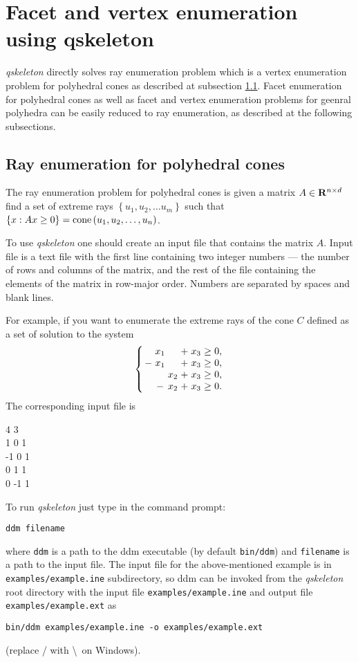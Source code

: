 \documentclass{article}
\newcommand{\qskeleton}{{\itshape qskeleton}\xspace}
\newcommand{\RR}{{\rm\bf R}}
\newcommand{\cone}[1]{\mathop{\rm cone} \left( #1 \right)}
\newcommand{\set}[1]{\left\{ #1\right\}}
\newenvironment{narrowarray}[1]{\arraycolsep=0.15em\begin{array}{#1}}{\end{array}}
\begin{document}
\section{Facet and vertex enumeration using qskeleton}

\qskeleton directly solves ray enumeration problem which is a vertex enumeration problem for polyhedral cones as described at subsection \ref{sec_RayEnumeration}. Facet enumeration for polyhedral cones as well as facet and vertex enumeration problems for geenral polyhedra can be easily reduced to ray enumeration, as described at the following subsections.

\subsection{Ray enumeration for polyhedral cones}\label{sec_RayEnumeration}

The ray enumeration problem for polyhedral cones is given a matrix $A\in\RR^{n\times d}$ find a set of extreme rays $\set{u_1, u_2, \dots u_m}$ such that  $\set{x: Ax \geq 0} = \cone{u_1, u_2, \dots, u_n}$.

To use \qskeleton one should create an input file that contains the matrix $A$. Input file is a text file with the first line containing two integer numbers --- the number of rows and columns of the matrix, and the rest of the file containing the elements of the matrix in row-major order. Numbers are separated by spaces and blank lines.

For example, if you want to enumerate the extreme rays of the cone $C$
defined as a set of solution to the system
$$
\left\{
\begin{narrowarray}{ccccccl}
 &x_1 &       & + & x_3  & \ge & 0, \\
-&x_1 &       & + & x_3 & \ge & 0, \\
 &      & x_2 & + & x_3 & \ge & 0, \\
 &     -& x_2 & + & x_3 & \ge & 0. \\
\end{narrowarray}
\right.
$$
The corresponding input file is
\begin{adjustwidth}{5cm}{0pt}
4 3 \\
1 0 1 \\
-1 0 1 \\
0 1 1 \\
0 -1 1
\end{adjustwidth}

To run \qskeleton just type in the command prompt:
\begin{verbatim}
ddm filename
\end{verbatim}
where \verb$ddm$ is a path to the ddm executable (by default \verb$bin/ddm$) and \verb$filename$ is a path to the input file. The input file for the above-mentioned example is in \verb$examples/example.ine$ subdirectory, so ddm can be invoked from the \qskeleton root directory with the input file \verb$examples/example.ine$ and output file \verb$examples/example.ext$ as 
\begin{verbatim}
bin/ddm examples/example.ine -o examples/example.ext
\end{verbatim}
(replace / with \textbackslash~on Windows).
\end{document}
